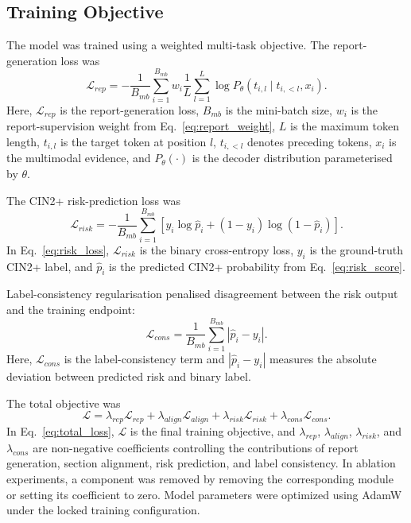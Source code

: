 \subsection{Training Objective}
\label{subsec:methods_objective}

The model was trained using a weighted multi-task objective. The report-generation loss was
\begin{equation}
\mathcal{L}_{rep}
=
-\frac{1}{B_{mb}}\sum_{i=1}^{B_{mb}}
w_i
\frac{1}{L}
\sum_{l=1}^{L}
\log P_{\theta}(t_{i,l}\mid t_{i,<l},x_i).
\label{eq:report_loss}
\end{equation}
Here, \(\mathcal{L}_{rep}\) is the report-generation loss, \(B_{mb}\) is the mini-batch size, \(w_i\) is the report-supervision weight from Eq.~\eqref{eq:report_weight}, \(L\) is the maximum token length, \(t_{i,l}\) is the target token at position \(l\), \(t_{i,<l}\) denotes preceding tokens, \(x_i\) is the multimodal evidence, and \(P_{\theta}(\cdot)\) is the decoder distribution parameterised by \(\theta\).

The CIN2+ risk-prediction loss was
\begin{equation}
\mathcal{L}_{risk}
=
-\frac{1}{B_{mb}}
\sum_{i=1}^{B_{mb}}
\left[
y_i\log\hat{p}_i+(1-y_i)\log(1-\hat{p}_i)
\right].
\label{eq:risk_loss}
\end{equation}
In Eq.~\eqref{eq:risk_loss}, \(\mathcal{L}_{risk}\) is the binary cross-entropy loss, \(y_i\) is the ground-truth CIN2+ label, and \(\hat{p}_i\) is the predicted CIN2+ probability from Eq.~\eqref{eq:risk_score}.

Label-consistency regularisation penalised disagreement between the risk output and the training endpoint:
\begin{equation}
\mathcal{L}_{cons}
=
\frac{1}{B_{mb}}\sum_{i=1}^{B_{mb}}|\hat{p}_i-y_i|.
\label{eq:cons_loss}
\end{equation}
Here, \(\mathcal{L}_{cons}\) is the label-consistency term and \(|\hat{p}_i-y_i|\) measures the absolute deviation between predicted risk and binary label.

The total objective was
\begin{equation}
\mathcal{L}
=
\lambda_{rep}\mathcal{L}_{rep}
+
\lambda_{align}\mathcal{L}_{align}
+
\lambda_{risk}\mathcal{L}_{risk}
+
\lambda_{cons}\mathcal{L}_{cons}.
\label{eq:total_loss}
\end{equation}
In Eq.~\eqref{eq:total_loss}, \(\mathcal{L}\) is the final training objective, and \(\lambda_{rep}\), \(\lambda_{align}\), \(\lambda_{risk}\), and \(\lambda_{cons}\) are non-negative coefficients controlling the contributions of report generation, section alignment, risk prediction, and label consistency. In ablation experiments, a component was removed by removing the corresponding module or setting its coefficient to zero. Model parameters were optimized using AdamW under the locked training configuration.

